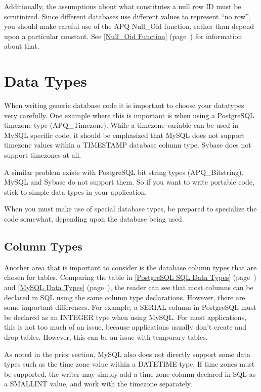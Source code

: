 \documentclass[english,letterpaper]{book}
\newcommand\Ref[1]{\textsection\ref{#1} (page~\pageref{#1})}
\begin{document}
Additionally, the assumptions about what constitutes a null row ID
must be scrutinized. Since different databases use different values
to represent ``no row'', you should make careful use of the APQ
Null\_Oid function, rather than depend upon a particular
constant. See \Ref{Null_Oid Function} for information about
that.


\section{Data Types}

When writing generic database code it is important to choose your
datatypes very carefully. One example where this is important is when
using a PostgreSQL timezone type (APQ\_Timezone).
While a timezone
variable can be used in MySQL specific code, it should be emphasized
that MySQL does not support timezone values within a TIMESTAMP database
column type. Sybase does not support timezones at all.

A similar problem exists with PostgreSQL bit string types (APQ\_Bitstring).
MySQL and Sybase do not support them. So if you want to write portable
code, stick to simple data types in your application. 

When you must make use of special database types, be prepared to specialize
the code somewhat, depending upon the database being used.


\subsection{Column Types}

Another area that is important to consider is the database column
 types that are chosen for tables. Comparing the table in
\Ref{PostgreSQL SQL Data Types} and \Ref{MySQL Data Types}, the
reader can see that most columns can be declared in SQL using the
same column type declarations. However, there are some important differences.
For example, a SERIAL column in PostgreSQL must be declared as an
INTEGER type when using MySQL. For most applications, this is not
too much of an issue, because applications usually don't create and
drop tables. However, this can be an issue with temporary tables.

As noted in the prior section, MySQL also does not directly support
some data types such as the time zone value within a DATETIME type.
If time zones must be supported, the writer may simply add a time
zone column declared in SQL as a SMALLINT value, and work with the
timezone separately.
\end{document}
